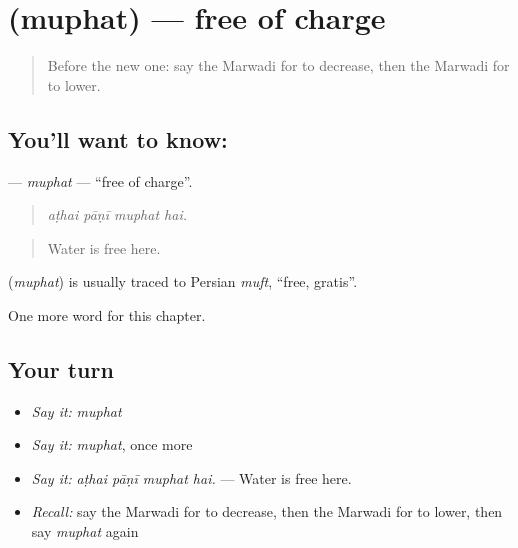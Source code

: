 \section[\texorpdfstring{\mw{मुफत} (muphat)}{मुफत (muphat)}]{ (muphat) — free of charge}

\label{lesson:MW-C213-muphat}



\begin{quote}
Before the new one: say the Marwadi for to decrease, then the Marwadi for to lower.
\end{quote}

\subsection*{You'll want to know: }
\textbf{} — \emph{muphat} — \textquotedblleft{}free of charge\textquotedblright{}.

\begin{quote}
   
\end{quote}

\begin{quote}
\emph{aṭhai pāṇī muphat hai.}
\end{quote}

\begin{quote}
Water is free here.
\end{quote}

\begin{cousinweb}
\textbf{} (\emph{muphat}) is usually traced to Persian \emph{muft}, \textquotedblleft{}free, gratis\textquotedblright{}.
\end{cousinweb}

\begin{grammarlens}[title={What you've built}]
One more word for this chapter.
\end{grammarlens}

\subsection*{Your turn}
\begin{itemize}
\raggedright
  \item \emph{Say it:} \emph{muphat}
  \item \emph{Say it:} \emph{muphat}, once more
  \item \emph{Say it:} \emph{aṭhai pāṇī muphat hai.} — Water is free here.
  \item \emph{Recall:} say the Marwadi for to decrease, then the Marwadi for to lower, then say \emph{muphat} again
\end{itemize}

